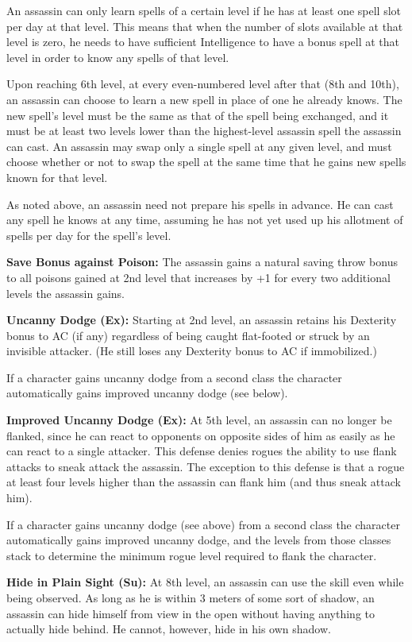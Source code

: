 {An assassin can only learn spells of a certain level if he has at least one spell slot per day at that level. This means that when the number of slots available at that level is zero, he needs to have sufficient Intelligence to have a bonus spell at that level in order to know any spells of that level.

Upon reaching 6th level, at every even-numbered level after that (8th and 10th), an assassin can choose to learn a new spell in place of one he already knows. The new spell's level must be the same as that of the spell being exchanged, and it must be at least two levels lower than the highest-level assassin spell the assassin can cast. An assassin may swap only a single spell at any given level, and must choose whether or not to swap the spell at the same time that he gains new spells known for that level.

As noted above, an assassin need not prepare his spells in advance. He can cast any spell he knows at any time, assuming he has not yet used up his allotment of spells per day for the spell's level.

\textbf{Save Bonus against Poison:} The assassin gains a natural saving throw bonus to all poisons gained at 2nd level that increases by +1 for every two additional levels the assassin gains.

\textbf{Uncanny Dodge (Ex):} Starting at 2nd level, an assassin retains his Dexterity bonus to AC (if any) regardless of being caught flat-footed or struck by an invisible attacker. (He still loses any Dexterity bonus to AC if immobilized.)

If a character gains uncanny dodge from a second class the character automatically gains improved uncanny dodge (see below).

\textbf{Improved Uncanny Dodge (Ex):} At 5th level, an assassin can no longer be flanked, since he can react to opponents on opposite sides of him as easily as he can react to a single attacker. This defense denies rogues the ability to use flank attacks to sneak attack the assassin. The exception to this defense is that a rogue at least four levels higher than the assassin can flank him (and thus sneak attack him).

If a character gains uncanny dodge (see above) from a second class the character automatically gains improved uncanny dodge, and the levels from those classes stack to determine the minimum rogue level required to flank the character.

\textbf{Hide in Plain Sight (Su):} At 8th level, an assassin can use the  skill even while being observed. As long as he is within 3 meters of some sort of shadow, an assassin can hide himself from view in the open without having anything to actually hide behind. He cannot, however, hide in his own shadow.

}
